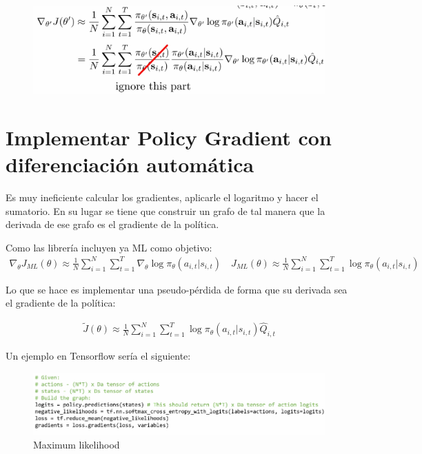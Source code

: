 \begin{figure}[htpb]
	\centering
	\includegraphics[width=0.8\linewidth]{figures/2020-06-13-131824_573x173_scrot.png}
\end{figure}

\section{Implementar Policy Gradient con diferenciación automática}%
\label{sec:implementar_policy_gradient_con_diferenciación_automática}

Es muy ineficiente calcular los gradientes, aplicarle el logaritmo y hacer el sumatorio. En su
lugar se tiene que construir un grafo de tal manera que la derivada de ese grafo es el
gradiente de la política.

Como las librería incluyen ya ML como objetivo:
\begin{align}
\nabla _ { \theta } J _ { ML } ( \theta ) \approx \frac { 1 } { N } \sum _ { i = 1 } ^ { N } \sum _ { t = 1 } ^ { T } \nabla _ { \theta } \operatorname { log } \pi _ { \theta } ( a _ { i , t } | s _ { i , t } ) \quad J _ { ML } ( \theta ) \approx \frac { 1 } { N } \sum _ { i = 1 } ^ { N } \sum _ { t = 1 } ^ { T } \operatorname { log } \pi _ { \theta } ( a _ { i , t } | s _ { i , t } )
\end{align}

Lo que se hace es implementar una pseudo-pérdida de forma que su derivada sea el gradiente de
la política:

\begin{align}
\tilde { J } ( \theta ) \approx \frac { 1 } { N } \sum _ { i = 1 } ^ { N } \sum _ { t = 1 } ^ { T } \operatorname { log } \pi _ { \theta } ( a _ { i , t } | s _ { i , t } ) \hat { Q } _ { i , t }
\end{align}

Un ejemplo en Tensorflow sería el siguiente:

\begin{figure}[H]
    \caption{Maximum likelihood}
	\centering
	\includegraphics[width=0.8\linewidth]{figures/2020-06-13-132416_897x193_scrot.png}
\end{figure}

